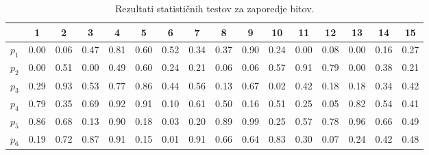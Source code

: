 \documentclass[11pt, oneside]{article}
\theoremstyle{definition}
\begin{document}

\begin{table}[h!]
    \begin{center}
        \hspace*{-0.8cm}
        \begin{tabular}{cccccccccccccccc}
            \toprule
            {}    & 1                        & 2    & 3                        & 4    & 5    & 6    & 7    & 8    & 9    & 10   & 11                       & 12   & 13                       & 14   & 15   \\
            \midrule
            $p_1$ & \cellcolor{red!40}  0.00 & 0.06 & 0.47                     & 0.81 & 0.60 & 0.52 & 0.34 & 0.37 & 0.90 & 0.24 & \cellcolor{red!40}  0.00 & 0.08 & \cellcolor{red!40}  0.00 & 0.16 & 0.27 \\
            $p_2$ & \cellcolor{red!40}  0.00 & 0.51 & \cellcolor{red!40}  0.00 & 0.49 & 0.60 & 0.24 & 0.21 & 0.06 & 0.06 & 0.57 & 0.91                     & 0.79 & 0.00                     & 0.38 & 0.21 \\
            \rowcolor{green!40}
            $p_3$ & 0.29                     & 0.93 & 0.53                     & 0.77 & 0.86 & 0.44 & 0.56 & 0.13 & 0.67 & 0.02 & 0.42                     & 0.18 & 0.18                     & 0.34 & 0.42 \\
            \rowcolor{green!40}
            $p_4$ & 0.79                     & 0.35 & 0.69                     & 0.92 & 0.91 & 0.10 & 0.61 & 0.50 & 0.16 & 0.51 & 0.25                     & 0.05 & 0.82                     & 0.54 & 0.41 \\
            \rowcolor{green!40}
            $p_5$ & 0.86                     & 0.68 & 0.13                     & 0.90 & 0.18 & 0.03 & 0.20 & 0.89 & 0.99 & 0.25 & 0.57                     & 0.78 & 0.96                     & 0.66 & 0.49 \\
            \rowcolor{green!40}
            $p_6$ & 0.19                     & 0.72 & 0.87                     & 0.91 & 0.15 & 0.01 & 0.91 & 0.66 & 0.64 & 0.83 & 0.30                     & 0.07 & 0.24                     & 0.42 & 0.48 \\
            \bottomrule
        \end{tabular}
    \end{center}
    \caption{Rezultati statističnih testov za zaporedje bitov.}
    \label{tab: 6}
\end{table}

\newpage
\end{document}
